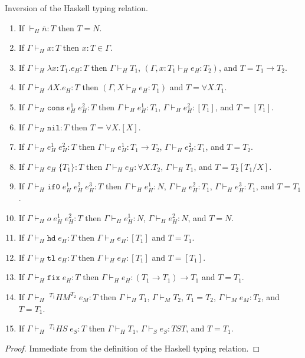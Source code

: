\begin{hil}
\label{hil}
Inversion of the Haskell typing relation.
\begin{enumerate}
\item If $\vdash_{H}\overline{n}:T$ then $T=N$.
\item If $\Gamma\vdash_{H}x:T$ then $x:T\in\Gamma$.
\item If $\Gamma\vdash_{H}\lambda x:T_{1}.e_{H}:T$ then $\Gamma\vdash_{H}T_{1}$, $(\Gamma,x:T_{1}\vdash_{H}e_{H}:T_{2})$, and $T=T_{1}\rightarrow T_{2}$.
\item If $\Gamma\vdash_{H}\Lambda X.e_{H}:T$ then $(\Gamma,X\vdash_{H}e_{H}:T_{1})$ and $T=\forall X.T_{1}$.
\item If $\Gamma\vdash_{H}\mathtt{cons}\;e_{H}^{1}\;e_{H}^{2}:T$ then $\Gamma\vdash_{H}e_{H}^{1}:T_{1}$, $\Gamma\vdash_{H}e_{H}^{2}:[T_{1}]$, and $T=[T_{1}]$.
\item If $\Gamma\vdash_{H}\mathtt{nil}:T$ then $T=\forall X.[X]$.
\item If $\Gamma\vdash_{H}e_{H}^{1}\;e_{H}^{2}:T$ then $\Gamma\vdash_{H}e_{H}^{1}:T_{1}\rightarrow T_{2}$, $\Gamma\vdash_{H}e_{H}^{2}:T_{1}$, and $T=T_{2}$.
\item If $\Gamma\vdash_{H}e_{H}\;\lbrace T_{1}\rbrace:T$ then $\Gamma\vdash_{H}e_{H}:\forall X.T_{2}$, $\Gamma\vdash_{H}T_{1}$, and $T=T_{2}[T_{1}/X]$.
\item If $\Gamma\vdash_{H}\mathtt{if0}\;e_{H}^{1}\;e_{H}^{2}\;e_{H}^{3}:T$ then $\Gamma\vdash_{H}e_{H}^{1}:N$, $\Gamma\vdash_{H}e_{H}^{2}:T_{1}$, $\Gamma\vdash_{H}e_{H}^{3}:T_{1}$, and $T=T_{1}$.
\item If $\Gamma\vdash_{H}o\;e_{H}^{1}\;e_{H}^{2}:T$ then $\Gamma\vdash_{H}e_{H}^{1}:N$, $\Gamma\vdash_{H}e_{H}^{2}:N$, and $T=N$.
\item If $\Gamma\vdash_{H}\mathtt{hd}\;e_{H}:T$ then $\Gamma\vdash_{H}e_{H}:[T_{1}]$ and $T=T_{1}$.
\item If $\Gamma\vdash_{H}\mathtt{tl}\;e_{H}:T$ then $\Gamma\vdash_{H}e_{H}:[T_{1}]$ and $T=[T_{1}]$.
\item If $\Gamma\vdash_{H}\mathtt{fix}\;e_{H}:T$ then $\Gamma\vdash_{H}e_{H}:(T_{1}\rightarrow T_{1})\rightarrow T_{1}$ and $T=T_{1}$.
\item If $\Gamma\vdash_{H}\;^{T_{1}}HM^{T_{2}}\;e_{M}:T$ then $\Gamma\vdash_{H}T_{1}$, $\Gamma\vdash_{M}T_{2}$, $T_{1}=T_{2}$, $\Gamma\vdash_{M}e_{M}:T_{2}$, and $T=T_{1}$.
\item If $\Gamma\vdash_{H}\;^{T_{1}}HS\;e_{S}:T$ then $\Gamma\vdash_{H}T_{1}$, $\Gamma\vdash_{S}e_{S}:TST$, and $T=T_{1}$.
\end{enumerate}
\begin{proof}
Immediate from the definition of the Haskell typing relation.
\end{proof}
\end{hil}